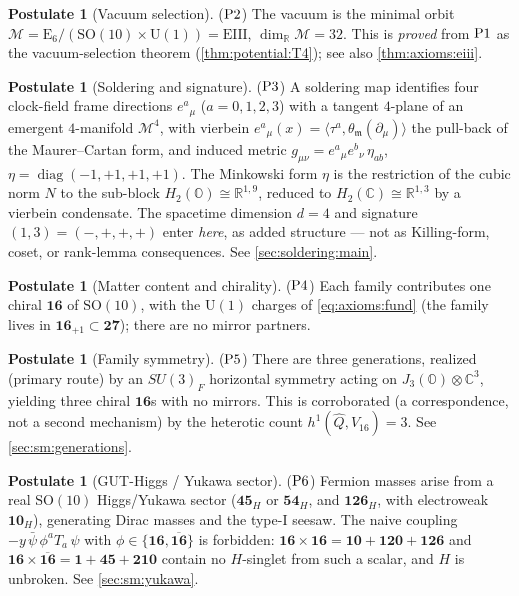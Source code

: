 \documentclass[11pt]{article}
\theoremstyle{plain}
\theoremstyle{definition}
\newtheorem{postulate}[theorem]{Postulate}
\theoremstyle{remark}
\newcommand{\SO}[1]{\mathrm{SO}(#1)}
\newcommand{\U}[1]{\mathrm{U}(#1)}
\newcommand{\E}[1]{\mathrm{E}_{#1}}
\newcommand{\diag}{\operatorname{diag}}
\newcommand{\Oct}{\mathbb{O}}
\newcommand{\M}{\mathcal{M}}
\newcommand{\jalg}{J_3(\mathbb{O})}
\newcommand{\SOTen}{\SO{10}}
\newcommand{\UOne}{\U{1}}
\newcommand{\ESix}{\E{6}}
\newcommand{\Rep}[1]{\mathbf{#1}}
\newcommand{\Repbar}[1]{\overline{\mathbf{#1}}}
\newcommand{\Pone}{\textnormal{P1}}
\newcommand{\Ptwo}{\textnormal{P2}}
\newcommand{\Pthree}{\textnormal{P3}}
\newcommand{\Pfour}{\textnormal{P4}}
\newcommand{\Pfive}{\textnormal{P5}}
\newcommand{\Psix}{\textnormal{P6}}
\begin{document}
\begin{postulate}[Vacuum selection]\label{post:axioms:P2}
($\Ptwo$) The vacuum is the minimal orbit
$\M=\ESix/(\SOTen\times\UOne)=\mathrm{EIII}$, $\dim_{\mathbb R}\M=32$. This is
\emph{proved} from $\Pone$ as the vacuum-selection theorem
(\autoref{thm:potential:T4}); see also \autoref{thm:axioms:eiii}.
\end{postulate}

\begin{postulate}[Soldering and signature]\label{post:axioms:P3}
($\Pthree$) A soldering map identifies four clock-field frame directions
$e^{a}{}_{\mu}$ ($a=0,1,2,3$) with a tangent $4$-plane of an emergent
$4$-manifold $\mathcal M^4$, with vierbein
$e^{a}{}_{\mu}(x)=\langle\tau^a,\theta_{\mathfrak m}(\partial_\mu)\rangle$
the pull-back of the Maurer--Cartan form, and induced metric
$g_{\mu\nu}=e^{a}{}_{\mu}e^{b}{}_{\nu}\,\eta_{ab}$,
$\eta=\diag(-1,+1,+1,+1)$. The Minkowski form $\eta$ is the restriction of
the cubic norm $N$ to the sub-block $H_2(\Oct)\cong\mathbb R^{1,9}$, reduced
to $H_2(\mathbb C)\cong\mathbb R^{1,3}$ by a vierbein condensate. The
spacetime dimension $d=4$ and signature $(1,3)=(-,+,+,+)$ enter \emph{here},
as added structure --- not as Killing-form, coset, or rank-lemma
consequences. See \autoref{sec:soldering:main}.
\end{postulate}

\begin{postulate}[Matter content and chirality]\label{post:axioms:P4}
($\Pfour$) Each family contributes one chiral $\Rep{16}$ of $\SOTen$, with
the $\UOne$ charges of \eqref{eq:axioms:fund} (the family lives in
$\Rep{16}_{+1}\subset\Rep{27}$); there are no mirror partners.
\end{postulate}

\begin{postulate}[Family symmetry]\label{post:axioms:P5}
($\Pfive$) There are three generations, realized (primary route) by an
$SU(3)_F$ horizontal symmetry acting on $\jalg\otimes\mathbb C^3$,
yielding three chiral $\Rep{16}$s with no mirrors. This is corroborated
(a correspondence, not a second mechanism) by the heterotic count
$h^1(\widehat Q,V_{16})=3$. See \autoref{sec:sm:generations}.
\end{postulate}

\begin{postulate}[GUT-Higgs / Yukawa sector]\label{post:axioms:P6}
($\Psix$) Fermion masses arise from a real $\SOTen$ Higgs/Yukawa sector
($\Rep{45}_H$ or $\Rep{54}_H$, and $\Rep{126}_H$, with electroweak
$\Rep{10}_H$), generating Dirac masses and the type-I seesaw. The naive
coupling $-y\,\bar\psi\,\phi^a T_a\,\psi$ with $\phi\in\{\Rep{16},\Repbar{16}\}$
is forbidden: $\Rep{16}\times\Rep{16}=\Rep{10}+\Rep{120}+\Rep{126}$ and
$\Rep{16}\times\Repbar{16}=\Rep{1}+\Rep{45}+\Rep{210}$ contain no $H$-singlet
from such a scalar, and $H$ is unbroken. See \autoref{sec:sm:yukawa}.
\end{postulate}
\end{document}

